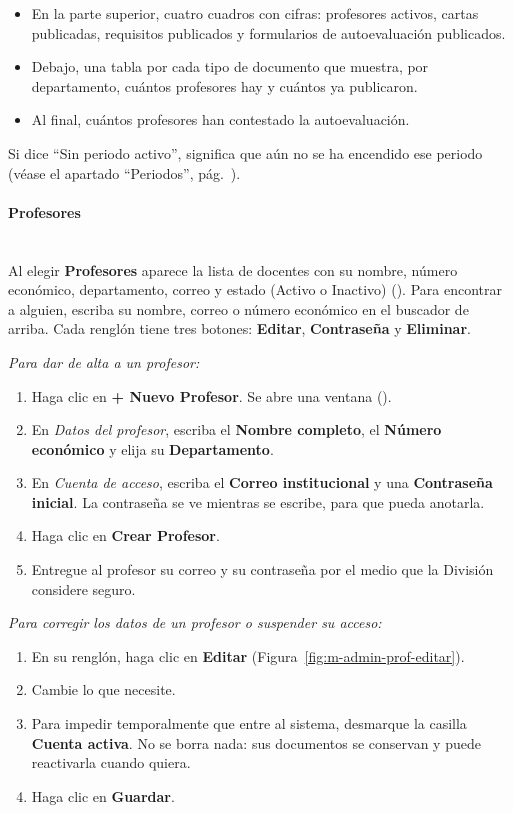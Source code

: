 \begin{itemize}
    \item En la parte superior, cuatro cuadros con cifras: profesores activos, cartas publicadas, requisitos publicados y formularios de autoevaluación publicados.
    \item Debajo, una tabla por cada tipo de documento que muestra, por departamento, cuántos profesores hay y cuántos ya publicaron.
    \item Al final, cuántos profesores han contestado la autoevaluación.
\end{itemize}

Si dice ``Sin periodo activo'', significa que aún no se ha encendido ese periodo (véase el apartado ``Periodos'', pág.~\pageref{apx:manual-user:admin-periodos}).

\paragraph{Profesores}\label{apx:manual-user:admin-profesores}\mbox{}\\
Al elegir \textbf{Profesores} aparece la lista de docentes con su nombre, número económico, departamento, correo y estado (Activo o Inactivo) (). Para encontrar a alguien, escriba su nombre, correo o número económico en el buscador de arriba. Cada renglón tiene tres botones: \textbf{Editar}, \textbf{Contraseña} y \textbf{Eliminar}.

\textit{Para dar de alta a un profesor:}
\begin{enumerate}
    \item Haga clic en \textbf{+ Nuevo Profesor}. Se abre una ventana ().
    \item En \emph{Datos del profesor}, escriba el \textbf{Nombre completo}, el \textbf{Número económico} y elija su \textbf{Departamento}.
    \item En \emph{Cuenta de acceso}, escriba el \textbf{Correo institucional} y una \textbf{Contraseña inicial}. La contraseña se ve mientras se escribe, para que pueda anotarla.
    \item Haga clic en \textbf{Crear Profesor}.
    \item Entregue al profesor su correo y su contraseña por el medio que la División considere seguro.
\end{enumerate}

\textit{Para corregir los datos de un profesor o suspender su acceso:}
\begin{enumerate}
    \item En su renglón, haga clic en \textbf{Editar} (Figura~\ref{fig:m-admin-prof-editar}).
    \item Cambie lo que necesite.
    \item Para impedir temporalmente que entre al sistema, desmarque la casilla \textbf{Cuenta activa}. No se borra nada: sus documentos se conservan y puede reactivarla cuando quiera.
    \item Haga clic en \textbf{Guardar}.
\end{enumerate}

